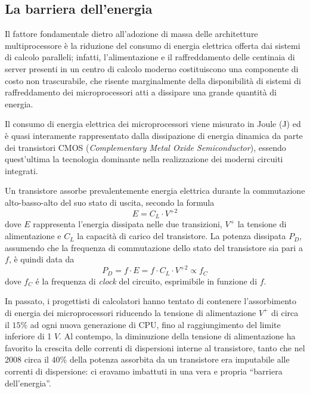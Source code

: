 \subsection{La barriera dell'energia}
\nocite{Spirito2021}
Il fattore fondamentale dietro all'adozione di massa delle architetture multiprocessore \`e la riduzione del consumo di energia elettrica offerta dai sistemi di calcolo paralleli; infatti, l'alimentazione e il raffreddamento delle centinaia di server presenti in un centro di calcolo moderno costituiscono una componente di costo non trascurabile, che risente marginalmente della disponibilit\`a di sistemi di raffreddamento dei microprocessori atti a dissipare una grande quantit\`a di energia.

Il consumo di energia elettrica dei microprocessori viene misurato in Joule (\si{J}) ed \`e quasi interamente rappresentato dalla dissipazione di energia dinamica da parte dei transistori CMOS (\textit{Complementary Metal Oxide Semiconductor}), essendo quest'ultima la tecnologia dominante nella realizzazione dei moderni circuiti integrati.

Un transistore assorbe prevalentemente energia elettrica durante la commutazione alto-basso-alto del suo stato di uscita, secondo la formula
$$
    E = C_{L} \cdot V^{+2}
$$
dove $E$ rappresenta l'energia dissipata nelle due transizioni, $V^{+}$ la tensione di alimentazione e $C_{L}$ la capacit\`a di carico del transistore.\newline
La potenza dissipata $P_{D}$, assumendo che la frequenza di commutazione dello stato del transistore sia pari a $f$, \`e quindi data da
$$
    P_{D} = f \cdot E = f \cdot C_{L} \cdot V^{+2} \propto f_{C}
$$
dove $f_{C}$ \'e la frequenza di \textit{clock} del circuito, esprimibile in funzione di $f$.

In passato, i progettisti di calcolatori hanno tentato di contenere l'assorbimento di energia dei microprocessori riducendo la tensione di alimentazione $V^{+}$ di circa il $15\%$ ad ogni nuova generazione di CPU, fino al raggiungimento del limite inferiore di 1 $\si{V}$.\newline
Al contempo, la diminuzione della tensione di alimentazione ha favorito la crescita delle correnti di dispersioni interne al transistore, tanto che nel 2008 circa il $40\%$ della potenza assorbita da un transistore era imputabile alle correnti di dispersione: ci eravamo imbattuti in una vera e propria \enquote{barriera dell'energia}.

